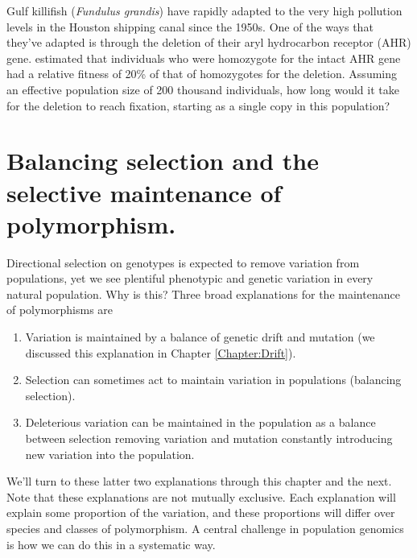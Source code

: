 \begin{question}
Gulf killifish ({\it Fundulus grandis}) have rapidly adapted to the
very high pollution levels in the Houston shipping canal since the
1950s. One of the ways that they've adapted is through the deletion of
their aryl hydrocarbon receptor (AHR) gene. \citet{oziolor2019adaptive} estimated that individuals who were homozygote for the intact AHR gene had a relative fitness of 20\% of that of homozygotes for the deletion. Assuming an effective population size of 200 thousand individuals, how long would it take for the deletion to reach fixation, starting as a single copy in this population?
\end{question}



\section{Balancing selection and the selective maintenance of polymorphism.}
Directional selection on genotypes is expected to remove variation
from populations, yet we see plentiful phenotypic and genetic
variation in every natural population. Why is this? Three broad
explanations for the maintenance of polymorphisms are
\begin{enumerate}
\item Variation is maintained by a balance of genetic drift and
  mutation (we discussed this explanation in Chapter
  \ref{Chapter:Drift}).
  \item Selection can sometimes act to maintain variation in
    populations (balancing selection). 
    \item Deleterious variation can be maintained in the population as
      a balance between selection removing variation and mutation
      constantly introducing new variation into the population. 
\end{enumerate}
We'll turn to these latter two explanations through this chapter and
the next.
Note that these explanations are not mutually exclusive. Each
explanation will explain some proportion of the variation, and these
proportions will differ over species and classes of polymorphism. A
central challenge in population genomics is how we can do this in a
systematic way. 

